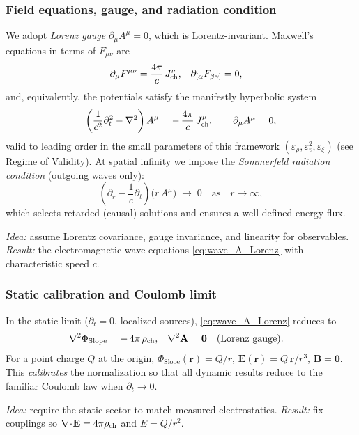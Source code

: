 \subsubsection{Field equations, gauge, and radiation condition}
We adopt \emph{Lorenz gauge} \(\partial_\mu A^\mu=0\), which is Lorentz-invariant.
Maxwell's equations in terms of \(F_{\mu\nu}\) are
\begin{align}
\partial_\mu F^{\mu\nu} &= \frac{4\pi}{c}\,J^\nu_{\rm ch}, &
\partial_{[\alpha}F_{\beta\gamma]} &= 0,
\end{align}
and, equivalently, the potentials satisfy the manifestly hyperbolic system
\begin{equation}
\left(\frac{1}{c^2}\partial_t^2-\nabla^2\right) A^\mu
= -\,\frac{4\pi}{c}\,J^\mu_{\rm ch}, \qquad \partial_\mu A^\mu=0,
\label{eq:wave_A_Lorenz}
\end{equation}
valid to leading order in the small parameters of this framework
\((\varepsilon_\rho,\varepsilon_v^2,\varepsilon_\xi)\) (see Regime of Validity).
At spatial infinity we impose the \emph{Sommerfeld radiation condition} (outgoing waves only):
\begin{equation}
\left(\partial_r - \frac{1}{c}\partial_t\right)\!\big(r\,A^\mu\big) \;\to\; 0
\quad \text{as}\quad r\to\infty,
\end{equation}
which selects retarded (causal) solutions and ensures a well-defined energy flux.

\noindent\emph{Idea:} assume Lorentz covariance, gauge invariance, and linearity for observables. \;
\emph{Result:} the electromagnetic wave equations \eqref{eq:wave_A_Lorenz} with characteristic speed \(c\).

\subsubsection{Static calibration and Coulomb limit}
In the static limit (\(\partial_t=0\), localized sources), \eqref{eq:wave_A_Lorenz} reduces to
\begin{align}
\nabla^2 \Phi_{\text{Slope}} &= -\,4\pi\,\rho_{\rm ch}, &
\nabla^2 \mathbf A &= \mathbf 0 \quad (\text{Lorenz gauge}).
\end{align}
For a point charge \(Q\) at the origin,
\(\Phi_{\text{Slope}}(\mathbf r)= Q/r\), \(\mathbf E(\mathbf r)= Q\,\mathbf r/r^3\), \(\mathbf B=\mathbf 0\).
This \emph{calibrates} the normalization so that all dynamic results reduce to the familiar Coulomb law when \(\partial_t\to0\).

\noindent\emph{Idea:} require the static sector to match measured electrostatics. \;
\emph{Result:} fix couplings so \(\nabla\!\cdot\!\mathbf E=4\pi\rho_{\rm ch}\) and \(E=Q/r^2\).

